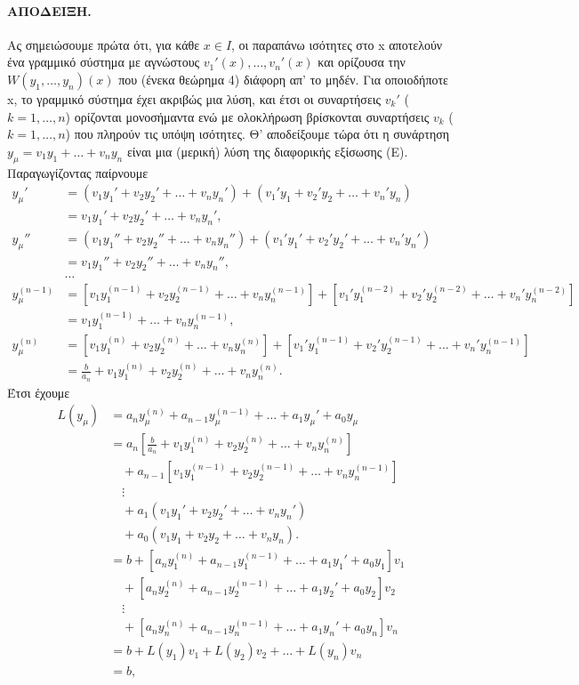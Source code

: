 \documentclass[11pt,a4paper,twoside]{book}
\begin{document}
\paragraph{ΑΠΟΔΕΙΞΗ.} Ας σημειώσουμε πρώτα ότι, για κάθε $x\in I$, οι παραπάνω ισότητες στο x αποτελούν ένα γραμμικό σύστημα με αγνώστους $v_1'(x),\dots,v_n'(x)$ και ορίζουσα την $W(y_1,\dots,y_n)(x)$ που (ένεκα θεώρημα 4) διάφορη απ' το μηδέν. Για οποιοδήποτε x, το γραμμικό σύστημα έχει ακριβώς μια λύση, και έτσι οι συναρτήσεις $v_k'$ ($k=1,\dots,n$) ορίζονται μονοσήμαντα ενώ με ολοκλήρωση βρίσκονται συναρτήσεις $v_k$ ($k=1,\dots,n$) που πληρούν τις υπόψη ισότητες.
Θ' αποδείξουμε τώρα ότι η συνάρτηση $y_\mu=v_1 y_1 + \dots + v_n y_n$ είναι μια (μερική) λύση της διαφορικής εξίσωσης (Ε). Παραγωγίζοντας παίρνουμε
\begin{align*}
    y_\mu' &= (v_1 y_1' + v_2 y_2' + \dots + v_n y_n') + (v_1' y_1 + v_2' y_2 + \dots + v_n' y_n) \\
    &= v_1 y_1' + v_2 y_2' + \dots + v_n y_n', \\
    y_\mu'' &= (v_1 y_1'' + v_2 y_2'' + \dots + v_n y_n'') + (v_1' y_1' + v_2' y_2' + \dots + v_n' y_n') \\
    &= v_1 y_1'' + v_2 y_2'' + \dots + v_n y_n'', \\
    &\dots \\
    y_\mu^{(n-1)} &= [v_1 y_1^{(n-1)} + v_2 y_2^{(n-1)} + \dots + v_n y_n^{(n-1)}] + [v_1' y_1^{(n-2)} + v_2' y_2^{(n-2)} + \dots + v_n' y_n^{(n-2)}] \\
    &= v_1 y_1^{(n-1)} + \dots + v_n y_n^{(n-1)}, \\
    y_\mu^{(n)} &= [v_1 y_1^{(n)} + v_2 y_2^{(n)} + \dots + v_n y_n^{(n)}] + [v_1' y_1^{(n-1)} + v_2' y_2^{(n-1)} + \dots + v_n' y_n^{(n-1)}] \\
    &= \frac{b}{a_n} + v_1 y_1^{(n)} + v_2 y_2^{(n)} + \dots + v_n y_n^{(n)}.
\end{align*}
Έτσι έχουμε
\begin{align*}
    L(y_\mu) &= a_n y_\mu^{(n)} + a_{n-1} y_\mu^{(n-1)} + \dots + a_1 y_\mu' + a_0 y_\mu \\
    &= a_n \left[ \frac{b}{a_n} + v_1 y_1^{(n)} + v_2 y_2^{(n)} + \dots + v_n y_n^{(n)} \right] \\
    &\quad + a_{n-1} [v_1 y_1^{(n-1)} + v_2 y_2^{(n-1)} + \dots + v_n y_n^{(n-1)}] \\
    &\quad \vdots \\
    &\quad + a_1 (v_1 y_1' + v_2 y_2' + \dots + v_n y_n') \\
    &\quad + a_0 (v_1 y_1 + v_2 y_2 + \dots + v_n y_n).\\
    &= b + [a_n y_1^{(n)} + a_{n-1} y_1^{(n-1)} + \dots + a_1 y_1' + a_0 y_1] v_1 \\
    &\quad + [a_n y_2^{(n)} + a_{n-1} y_2^{(n-1)} + \dots + a_1 y_2' + a_0 y_2] v_2 \\
    &\quad \vdots \\
    &\quad + [a_n y_n^{(n)} + a_{n-1} y_n^{(n-1)} + \dots + a_1 y_n' + a_0 y_n] v_n \\
    &= b + L(y_1)v_1 + L(y_2)v_2 + \dots + L(y_n)v_n \\
    &= b,
\end{align*}
\end{document}

